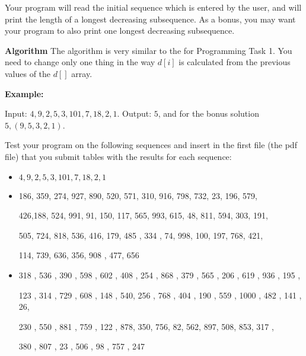 \documentclass[11pt]{article}
\begin{document}
Your program will read the initial sequence which is entered by the user, and will print the length of a longest decreasing subsequence.  As a bonus, you may want your program to also print one longest decreasing subsequence.
\smallskip

\textbf{Algorithm}  The algorithm is very similar to the for Programming Task 1. You need to change only one thing in the way $d[i]$ is calculated from the previous values of the $d[]$ array. 
\medskip

\textbf{Example:}

Input: $4,9,2,5,3,101,7, 18,2,1$.
Output: $5$,  and for the bonus solution $5, (9,5,3,2,1)$.
\smallskip

Test your program on the following sequences and insert in the first file (the pdf file) that you submit  tables  with the results for each sequence:

\begin{itemize}
\item $4,9,2,5,3,101, 7, 18,2,1$
\item 186, 359, 274,  927,  890,  520,  571,  310,  916,  798,  732,  23, 196, 579, 

426,188,  524,  991,   91,  150,  117,  565,  993,  615,   48, 811,  594,  303,  191,  

505,  724,  818,  536,  416,  179,  485 , 334  , 74,  998,  100,  197,  768,  421,  

114,  739,  636,  356,  908 , 477,  656
\item 318 ,  536  , 390  , 598  , 602 ,  408  , 254  , 868 ,  379  , 565  ,  206  ,  619  ,  936  ,  195 ,  

 123  ,  314  ,  729 ,  608  , 148 ,  540,   256 ,  768 ,  404  ,  190  ,  559 ,  1000 ,   482  ,  141 ,  26,   
 
  230  ,  550  ,  881  ,  759  ,  122 ,   878,    350,    756,     82,    562,    897,    508,    853,    317 ,   
  
  380 ,   807 ,    23 ,   506  ,   98 ,   757 ,   247
\end{itemize}
\end{document}
